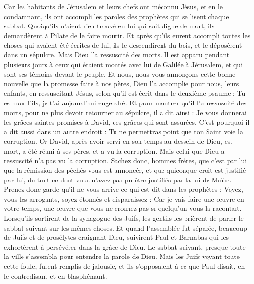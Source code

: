 \begin{multicols}{2}
Car les habitants de Jérusalem et leurs chefs ont méconnu Jésus, et en le condamnant, ils ont accompli les paroles des prophètes qui se lisent chaque sabbat.
Quoiqu'ils n’aient rien trouvé en lui qui soit digne de mort, ils demandèrent à Pilate de le faire mourir.
Et après qu'ils eurent accompli toutes les choses qui avaient été écrites de lui, ils le descendirent du bois, et le déposèrent dans un sépulcre.
Mais Dieu l'a ressuscité des morts.
Il est apparu pendant plusieurs jours à ceux qui étaient montés avec lui de Galilée à Jérusalem, et qui sont ses témoins devant le peuple.
Et nous, nous vous annonçons cette bonne nouvelle que la promesse faite à nos pères,
Dieu l'a accomplie pour nous, leurs enfants, en ressuscitant Jésus, selon qu'il est écrit dans le deuxième psaume : Tu es mon Fils, je t'ai aujourd'hui engendré.
Et pour montrer qu'il l'a ressuscité des morts, pour ne plus devoir retourner au sépulcre, il a dit ainsi : Je vous donnerai les grâces saintes promises à David, ces grâces qui sont assurées.
C'est pourquoi il a dit aussi dans un autre endroit : Tu ne permettras point que ton Saint voie la corruption.
Or David, après avoir servi en son temps au dessein de Dieu, est mort, a été réuni à ses pères, et a vu la corruption.
Mais celui que Dieu a ressuscité n'a pas vu la corruption.
Sachez donc, hommes frères, que c'est par lui que la rémission des péchés vous est annoncée,
et que quiconque croit est justifié par lui, de tout ce dont vous n'avez pas pu être justifiés par la loi de Moïse.
Prenez donc garde qu'il ne vous arrive ce qui est dit dans les prophètes :
Voyez, vous les arrogants, soyez étonnés et disparaissez : Car je vais faire une œuvre en votre temps, une œuvre que vous ne croiriez pas si quelqu'un vous la racontait.
Lorsqu’ils sortirent de la synagogue des Juifs, les gentils les prièrent de parler le sabbat suivant sur les mêmes choses.
Et quand l'assemblée fut séparée, beaucoup de Juifs et de prosélytes craignant Dieu, suivirent Paul et Barnabas qui les exhortèrent à persévérer dans la grâce de Dieu.
Le sabbat suivant, presque toute la ville s'assembla pour entendre la parole de Dieu.
Mais les Juifs voyant toute cette foule, furent remplis de jalousie, et ils s’opposaient à ce que Paul disait, en le contredisant et en blasphémant.

\end{multicols}
